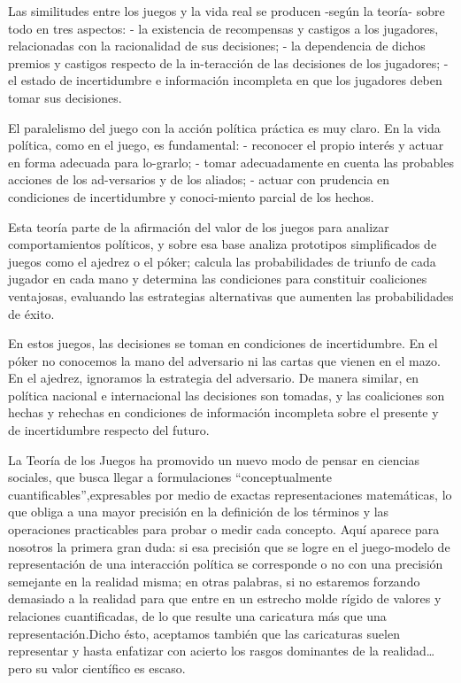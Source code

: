 \documentclass[
]{book}
\begin{document}
Las similitudes entre los juegos y la vida real se producen -según la teoría- sobre todo en tres aspectos: - la existencia de recompensas y castigos a los jugadores, relacionadas con la racionalidad de sus decisiones; - la dependencia de dichos premios y castigos respecto de la in-teracción de las decisiones de los jugadores; - el estado de incertidumbre e información incompleta en que los jugadores deben tomar sus decisiones.

El paralelismo del juego con la acción política práctica es muy claro. En la vida política, como en el juego, es fundamental: - reconocer el propio interés y actuar en forma adecuada para lo-grarlo; - tomar adecuadamente en cuenta las probables acciones de los ad-versarios y de los aliados; - actuar con prudencia en condiciones de incertidumbre y conoci-miento parcial de los hechos.

Esta teoría parte de la afirmación del valor de los juegos para analizar comportamientos políticos, y sobre esa base analiza prototipos simplificados de juegos como el ajedrez o el póker; calcula las probabilidades de triunfo de cada jugador en cada mano y determina las condiciones para constituir coaliciones ventajosas, evaluando las estrategias alternativas que aumenten las probabilidades de éxito.

En estos juegos, las decisiones se toman en condiciones de incertidumbre. En el póker no conocemos la mano del adversario ni las cartas que vienen en el mazo. En el ajedrez, ignoramos la estrategia del adversario. De manera similar, en política nacional e internacional las decisiones son tomadas, y las coaliciones son hechas y rehechas en condiciones de información incompleta sobre el presente y de incertidumbre respecto del futuro.

La Teoría de los Juegos ha promovido un nuevo modo de pensar en ciencias sociales, que busca llegar a formulaciones ``conceptualmente cuantificables'',expresables por medio de exactas representaciones matemáticas, lo que obliga a una mayor precisión en la definición de los términos y las operaciones practicables para probar o medir cada concepto. Aquí aparece para nosotros la primera gran duda: si esa precisión que se logre en el juego-modelo de representación de una interacción política se corresponde o no con una precisión semejante en la realidad misma; en otras palabras, si no estaremos forzando demasiado a la realidad para que entre en un estrecho molde rígido de valores y relaciones cuantificadas, de lo que resulte una caricatura más que una representación.Dicho ésto, aceptamos también que las caricaturas suelen representar y hasta enfatizar con acierto los rasgos dominantes de la realidad\ldots pero su valor científico es escaso.
\end{document}
